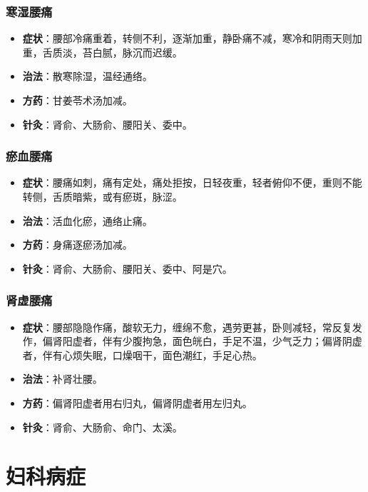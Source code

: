 \documentclass[12pt,UTF8]{ctexbook}
\begin{document}
\subsubsection{寒湿腰痛}

\begin{itemize}
\item \textbf{症状}：腰部冷痛重着，转侧不利，逐渐加重，静卧痛不减，寒冷和阴雨天则加重，舌质淡，苔白腻，脉沉而迟缓。
\item \textbf{治法}：散寒除湿，温经通络。
\item \textbf{方药}：甘姜苓术汤加减。
\item \textbf{针灸}：肾俞、大肠俞、腰阳关、委中。
\end{itemize}

\subsubsection{瘀血腰痛}

\begin{itemize}
\item \textbf{症状}：腰痛如刺，痛有定处，痛处拒按，日轻夜重，轻者俯仰不便，重则不能转侧，舌质暗紫，或有瘀斑，脉涩。
\item \textbf{治法}：活血化瘀，通络止痛。
\item \textbf{方药}：身痛逐瘀汤加减。
\item \textbf{针灸}：肾俞、大肠俞、腰阳关、委中、阿是穴。
\end{itemize}

\subsubsection{肾虚腰痛}

\begin{itemize}
\item \textbf{症状}：腰部隐隐作痛，酸软无力，缠绵不愈，遇劳更甚，卧则减轻，常反复发作，偏肾阳虚者，伴有少腹拘急，面色㿠白，手足不温，少气乏力；偏肾阴虚者，伴有心烦失眠，口燥咽干，面色潮红，手足心热。
\item \textbf{治法}：补肾壮腰。
\item \textbf{方药}：偏肾阳虚者用右归丸，偏肾阴虚者用左归丸。
\item \textbf{针灸}：肾俞、大肠俞、命门、太溪。
\end{itemize}

\section{妇科病症}
\end{document}
